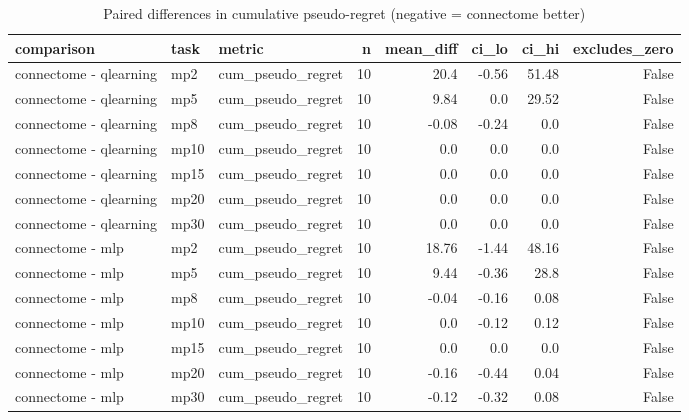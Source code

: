 \begin{table}[t]
\centering
\small
\begin{tabular}{lllrrrrr}
\toprule
comparison & task & metric & n & mean\_diff & ci\_lo & ci\_hi & excludes\_zero \\
\midrule
connectome - qlearning & mp2 & cum\_pseudo\_regret & 10 & 20.4 & -0.56 & 51.48 & False \\
connectome - qlearning & mp5 & cum\_pseudo\_regret & 10 & 9.84 & 0.0 & 29.52 & False \\
connectome - qlearning & mp8 & cum\_pseudo\_regret & 10 & -0.08 & -0.24 & 0.0 & False \\
connectome - qlearning & mp10 & cum\_pseudo\_regret & 10 & 0.0 & 0.0 & 0.0 & False \\
connectome - qlearning & mp15 & cum\_pseudo\_regret & 10 & 0.0 & 0.0 & 0.0 & False \\
connectome - qlearning & mp20 & cum\_pseudo\_regret & 10 & 0.0 & 0.0 & 0.0 & False \\
connectome - qlearning & mp30 & cum\_pseudo\_regret & 10 & 0.0 & 0.0 & 0.0 & False \\
connectome - mlp & mp2 & cum\_pseudo\_regret & 10 & 18.76 & -1.44 & 48.16 & False \\
connectome - mlp & mp5 & cum\_pseudo\_regret & 10 & 9.44 & -0.36 & 28.8 & False \\
connectome - mlp & mp8 & cum\_pseudo\_regret & 10 & -0.04 & -0.16 & 0.08 & False \\
connectome - mlp & mp10 & cum\_pseudo\_regret & 10 & 0.0 & -0.12 & 0.12 & False \\
connectome - mlp & mp15 & cum\_pseudo\_regret & 10 & 0.0 & 0.0 & 0.0 & False \\
connectome - mlp & mp20 & cum\_pseudo\_regret & 10 & -0.16 & -0.44 & 0.04 & False \\
connectome - mlp & mp30 & cum\_pseudo\_regret & 10 & -0.12 & -0.32 & 0.08 & False \\
\bottomrule
\end{tabular}
\caption{Paired differences in cumulative pseudo-regret (negative = connectome better)}
\label{tab:bandit_paired}
\end{table}